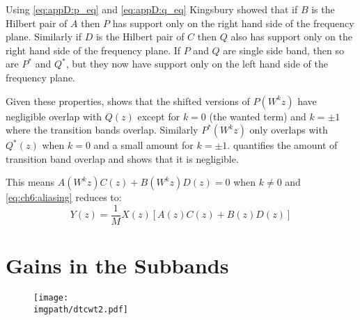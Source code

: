 Using \eqref{eq:appD:p_eq} and \eqref{eq:appD:q_eq} Kingsbury showed that if $B$ is the Hilbert pair
of $A$ then $P$ has support only on the right hand side of the frequency plane.
Similarly if $D$ is the Hilbert pair of $C$ then $Q$ also has support only on
the right hand side of the frequency plane. If $P$ and $Q$ are single side band,
then so are $P^*$ and $Q^*$, but they now have support only on the left hand
side of the frequency plane. 

Given these properties, \cite[figure 5]{kingsbury_complex_2001} shows that the
shifted versions of $P(W^k z)$ have negligible overlap with $Q(z)$ except for
$k=0$ (the wanted term) and $k=\pm 1$ where the transition bands overlap.
Similarly $P^*(W^k z)$ only overlaps with $Q^*(z)$ when $k=0$ and a small amount
for $k = \pm 1$. \cite{kingsbury_complex_2001} quantifies the amount of transition
band overlap and shows that it is negligible.

This means $A(W^k z)C(z) + B(W^k z)D(z) = 0$ when $k\neq 0$ and 
\eqref{eq:ch6:aliasing} reduces to:
\begin{equation}
  Y(z) =  \frac{1}{M} X(z)\left[ A(z)C(z) + B(z)D(z) \right]
  \label{eq:ch6:aliasing_cancel} 
\end{equation}

\section{Gains in the Subbands}
\begin{figure}[t]
  \centering
  \texttt{[image: \\imgpath/dtcwt2.pdf]}
  \label{fig:ch6:dtcwt_two_tree_gain}
\end{figure}


